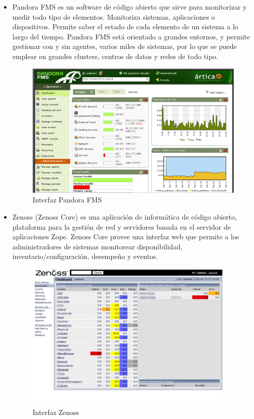 \documentclass[11pt,a4paper]{article}
\begin{document}
\begin{itemize}

\item Pandora FMS\cite{web-PandoraFMS} es un software de código abierto que sirve para monitorizar y medir todo tipo de elementos. Monitoriza sistemas, aplicaciones o dispositivos. Permite saber el estado de cada elemento de un sistema a lo largo del tiempo. Pandora FMS está orientado a grandes entornos, y permite gestionar con y sin agentes, varios miles de sistemas, por lo que se puede emplear en grandes clusters, centros de datos y redes de todo tipo.

\begin{figure}[hbtp]
\centerline{\includegraphics[width=10 cm]{pandoraFMS.png}}
\caption{Interfaz Pandora FMS}
\label{PandoraFMS}
\end{figure}


\item Zenoss (Zenoss Core)\cite{web-Zenoss} es una aplicación de informática de código abierto, plataforma para la gestión de red y servidores basada en el servidor de aplicaciones Zope. Zenoss Core provee una interfaz web que permite a los administradores de sistemas monitorear disponibilidad, inventario/configuración, desempeño y eventos.

\begin{figure}[hbtp]
\centerline{\includegraphics[width=10cm]{Zenossscreen.jpg}}
\caption{Interfaz Zenoss}
\label{Zenoss}
\end{figure}

\end{itemize}
    
\end{document}

